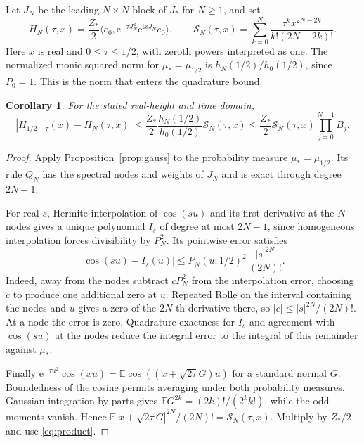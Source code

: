 \documentclass[11pt]{article}
\newtheorem{corollary}[theorem]{Corollary}
\numberwithin{equation}{section}
\newcommand{\e}{\mathrm e}
\newcommand{\ii}{\mathrm i}
\begin{document}
Let \(J_N\) be the leading \(N\times N\) block of \(J_*\) for
\(N\ge1\), and set
\[
 H_N(\tau,x)=\frac{Z_*}{2}
       \langle e_0,\e^{-\tau J_N^2}\e^{\ii xJ_N}e_0\rangle,
 \qquad
 \mathcal S_N(\tau,x)=\sum_{k=0}^N
       \frac{\tau^k x^{2N-2k}}{k!(2N-2k)!}.
\]
Here \(x\) is real and \(0\le\tau\le1/2\), with zeroth powers
interpreted as one. The normalized monic squared norm for
\(\mu_*=\mu_{1/2}\) is \(h_N(1/2)/h_0(1/2)\), since
\(P_0=1\). This is the norm that enters the quadrature bound.

\begin{corollary}
\label{cor:scalar}
For the stated real-height and time domain,
\[
 |H_{1/2-\tau}(x)-H_N(\tau,x)|
 \le\frac{Z_*}{2}\frac{h_N(1/2)}{h_0(1/2)}\mathcal S_N(\tau,x)
 \le\frac{Z_*}{2}\mathcal S_N(\tau,x)\prod_{j=0}^{N-1}B_j .
\]
\end{corollary}

\begin{proof}
Apply Proposition~\ref{prop:gauss} to the probability measure
\(\mu_*=\mu_{1/2}\). Its rule \(Q_N\) has the spectral nodes and
weights of \(J_N\) and is exact through degree \(2N-1\).

For real \(s\), Hermite interpolation of \(\cos(su)\) and its first
derivative at the \(N\) nodes gives a unique polynomial \(I_s\)
of degree at most \(2N-1\), since homogeneous interpolation
forces divisibility by \(P_N^2\). Its pointwise error satisfies
\[
 |\cos(su)-I_s(u)|
     \le P_N(u;1/2)^2\,\frac{|s|^{2N}}{(2N)!}.
\]
Indeed, away from the nodes subtract
\(cP_N^2\) from the interpolation error, choosing \(c\) to produce
one additional zero at \(u\). Repeated Rolle on the interval
containing the nodes and \(u\) gives a zero of the \(2N\)-th
derivative there, so \(|c|\le |s|^{2N}/(2N)!\).
At a node the error is zero. Quadrature exactness for \(I_s\)
and agreement with \(\cos(su)\) at the nodes reduce the integral
error to the integral of this remainder against \(\mu_*\).

Finally \(\e^{-\tau u^2}\cos(xu)=\mathbb E\cos((x+\sqrt{2\tau}G)u)\)
for a standard normal \(G\). Boundedness of the cosine permits
averaging under both probability measures. Gaussian integration
by parts gives \(\mathbb E G^{2k}=(2k)!/(2^k k!)\), while the odd
moments vanish. Hence \(\mathbb E|x+\sqrt{2\tau}G|^{2N}/(2N)!
=\mathcal S_N(\tau,x)\). Multiply by \(Z_*/2\) and use
\eqref{eq:product}.
\end{proof}


\end{document}
